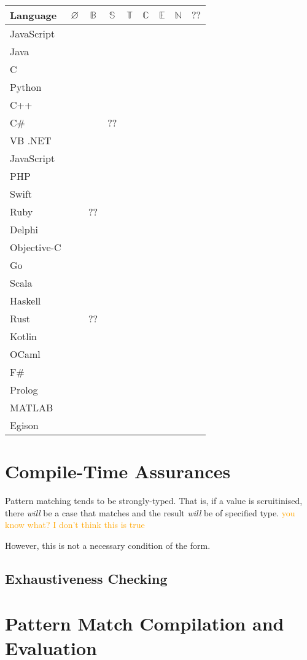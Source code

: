 \documentclass[acmsmall]{acmart}
\newcommand{\cmark}{\ding{51}}%
\newcommand{\xmark}{\ding{55}}%
\renewcommand\todo[1]{\textcolor{orange}{#1}}
\begin{document}
\begin{tabular}{l|c|c|c|c|c|c|c|c|}
Language & $\varnothing$ & $\mathbb{B}$ & $\mathbb{S}$ & $\mathbb{T}$ & $\mathbb{C}$ & $\mathbb{E}$ & $\mathbb{N}$ & $\mathbb{??}$ \\ 
\hline
JavaScript & \cmark & \xmark & \xmark & \xmark & \xmark & \xmark & \xmark & \xmark \\
Java \\
C    \\
Python \\
C++ \\
C\#       & \cmark & \cmark & ?? & \cmark \\
VB .NET \\
JavaScript \\
PHP \\
Swift \\
Ruby     & \cmark & ?? & \cmark \\
Delphi \\
Objective-C \\
Go \\
Scala    & \cmark & \cmark & \cmark \\
Haskell  & \cmark & \cmark & \xmark \\
Rust     & \cmark & ?? & \cmark \\
Kotlin \\
OCaml \\
F\# \\
Prolog \\
MATLAB \\
Egison \\

\end{tabular}

\section{Compile-Time Assurances}

Pattern matching tends to be strongly-typed.  That is, if a value is scruitinised, there \emph{will} be a case that matches and the result \emph{will} be of specified type.  \todo{you know what? I don't think this is true}

However, this is not a necessary condition of the form.

\subsection{Exhaustiveness Checking}

\section{Pattern Match Compilation and Evaluation}
\end{document}
